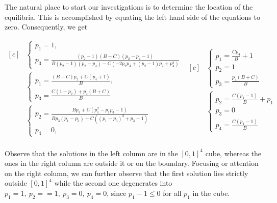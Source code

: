 \documentclass{article}
\theoremstyle{definition}
\numberwithin{equation}{section}
\begin{document}
The natural place to start our investigations is to determine the location of the equilibria. 
This is accomplished by equating the left hand side of the equations to zero. Consequently, we get
\begin{small}
    \begin{equation}
    \label{eq:equilibria}
    \begin{aligned}[c]
            &\begin{cases}
               p_1= 1,\\
               p_3= \frac{(p_2-1) (B-C) (p_2-p_4-1)}{B (p_2-1) (p_2-p_4)-C \left(-2 p_2 p_4+(p_2-1) p_2+p_4^2\right)}
               \end{cases}\\
               &\begin{cases}
              p_1=\frac{(B-C) p_2+C(p_4+1)}{B},\\
              p_3= \frac{C(1-p_2) + p_4(B+C)}{B}
               \end{cases}\\
               &\begin{cases}
              p_2= \frac{B p_3+C\left(p_1^2-p_1 p_3-1\right)}{B p_3 (p_1-p_3)+C \left((p_1-p_3)^2+p_3-1\right)}\\
              p_4= 0,
               \end{cases}\\
        \end{aligned}
        \begin{aligned}[c]
          &  \begin{cases}
                p_1 = \frac{C p_4}{B}+1\\
                p_2=1\\
                p_3=\frac{p_4 (B+C)}{B}
            \end{cases} \\
        &    \begin{cases}
                p_2= \frac{C (p_1-1)}{B}+p_1\\
                p_3= 0\\
                p_4 = \frac{C (p_1-1)}{B }
            \end{cases}
        \end{aligned}
    \end{equation}
\end{small}

Observe that the solutions in the left column are in the $[0,1]^4$ cube, whereas the ones in the right column are outside it or on the boundary.  
Focusing or attention on the right column, we can further observe that the first solution lies strictly outside $[0,1]^4$ while the second one  degenerates into $p_1 = 1,  \ p_2 = =1,  \ p_3=0, \ p_4 = 0$, since $p_1-1\le 0$ for all $p_1$ in the cube. 
\end{document}
